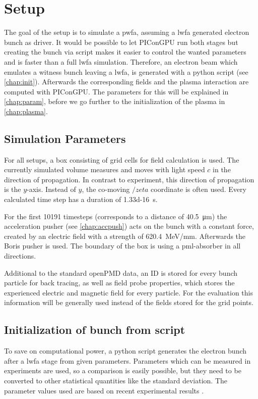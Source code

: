\documentclass[bachelor_thesis]{subfiles}
\begin{document}
\chapter{Setup}
The goal of the setup is to simulate a \gls{pwfa}, assuming a \gls{lwfa} generated electron bunch as driver. It would be possible to let PIConGPU run both stages but creating the bunch via script makes it easier to control the wanted parameters and is faster than a full \gls{lwfa} simulation.
Therefore, an electron beam which emulates a witness bunch leaving a \gls{lwfa}, is generated with a python script (see \autoref{chap:init}). Afterwards the corresponding fields and the plasma interaction are computed with PIConGPU. 
The parameters for this will  be explained in \autoref{chap:param}, before we go further to the initialization of the plasma in \autoref{chap:plasma}.


\section{Simulation Parameters}\label{chap:param}
For all setups, a box consisting of  grid cells for field calculation is used. The currently simulated volume measures  and moves with light speed $c$ in the direction of propagation.
In contrast to experiment, this direction of propagation is the $y$-axis. Instead of $y$, the co-moving $/zeta$ coordinate is often used.
Every calculated time step has a duration of \qty{1.33d-16}{\s}. 

For the first \num{10191} timesteps (corresponds to a distance of \qty{40.5}{\um}) the acceleration pusher (see \autoref{chap:accpush}) acts on the bunch with a constant force, 
created by an electric field with a strength of \qty{620.4}{\MeV/\mm}. Afterwards the Boris pusher is used. 
The boundary of the box is using a \gls{pml}-absorber in all directions. 

Additional to the standard openPMD data, an ID is stored for every bunch particle for back tracing, as well as field probe properties, which stores the experienced electric and magnetic field for every particle. 
For the evaluation this information will be generally used instead of the fields stored for the grid points.


\section{Initialization of bunch from script}\label{chap:init}
To save on computational power, a python script generates the electron bunch after a \gls{lwfa} stage from given parameters. Parameters which can be measured in experiments are used,
so a comparison is easily possible, but they need to be converted to other statistical quantities like the standard deviation. The parameter values used are based on recent experimental results \cite{Kurz2021, Schoebel2022, Cabadag2021}.
\end{document}
